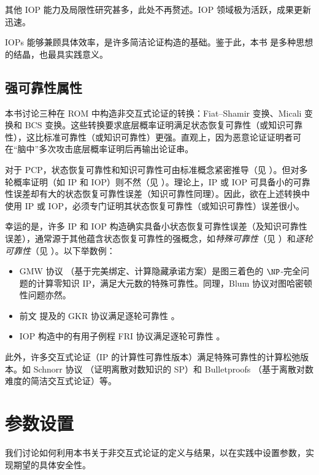 \documentclass[american,singlepageview]{snargs-book-zh}
\begin{document}
其他 IOP 能力及局限性研究甚多，此处不再赘述。IOP 领域极为活跃，成果更新迅速。

IOPs 能够兼顾具体效率，是许多简洁论证构造的基础。鉴于此，本书  是多种思想的结晶，也最具实践意义。

\section{强可靠性属性}
\label{section:strong-soundness-properties}

本书讨论三种在 ROM 中构造非交互式论证的转换：Fiat--Shamir 变换、Micali 变换和 BCS 变换。这些转换要求底层概率证明满足状态恢复可靠性（或知识可靠性），这比标准可靠性（或知识可靠性）更强。直观上，因为恶意论证证明者可在“脑中”多次攻击底层概率证明后再输出论证串。

对于 PCP，状态恢复可靠性和知识可靠性可由标准概念紧密推导（见 ）。但对多轮概率证明（如 IP 和 IOP）则不然（见 ）。理论上，IP 或 IOP 可具备小的可靠性误差却有大的状态恢复可靠性误差（知识可靠性同理）。因此，欲在上述转换中使用 IP 或 IOP，必须专门证明其状态恢复可靠性（或知识可靠性）误差很小。

幸运的是，许多 IP 和 IOP 构造确实具备小状态恢复可靠性误差（及知识可靠性误差），通常源于其他蕴含状态恢复可靠性的强概念，如\emph{特殊可靠性}（见 ）和\emph{逐轮可靠性}（见 ）。以下举数例：
\begin{itemize}[noitemsep]
  \item GMW 协议 \cite{GoldreichMW91}（基于完美绑定、计算隐藏承诺方案）是图三着色的 $\NP$-完全问题的计算零知识 IP，满足大元数的特殊可靠性。同理，Blum 协议对图哈密顿性问题亦然。
  \item 前文  提及的 GKR 协议满足逐轮可靠性 \cite{CanettiCHLRR18}。
  \item IOP 构造中的有用子例程 FRI 协议满足逐轮可靠性 \cite{BlockGKTTZ23}。
\end{itemize}
此外，许多交互式论证（IP 的计算性可靠性版本）满足特殊可靠性的计算松弛版本。如 Schnorr 协议 \cite{Schnorr89}（证明离散对数知识的 SP）和 Bulletproofs \cite{BuenzBBPWM18}（基于离散对数难度的简洁交互式论证）等。

\chapter{参数设置}
\label{chapter:setting-parameters}

我们讨论如何利用本书关于非交互式论证的定义与结果，以在实践中设置参数，实现期望的具体安全性。
\end{document}

